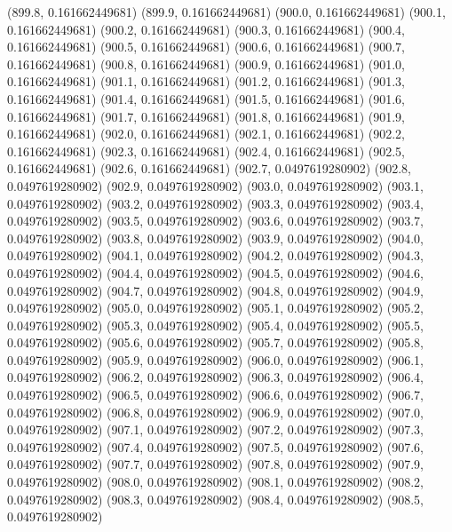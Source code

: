 {					(899.8, 0.161662449681)
					(899.9, 0.161662449681)
					(900.0, 0.161662449681)
					(900.1, 0.161662449681)
					(900.2, 0.161662449681)
					(900.3, 0.161662449681)
					(900.4, 0.161662449681)
					(900.5, 0.161662449681)
					(900.6, 0.161662449681)
					(900.7, 0.161662449681)
					(900.8, 0.161662449681)
					(900.9, 0.161662449681)
					(901.0, 0.161662449681)
					(901.1, 0.161662449681)
					(901.2, 0.161662449681)
					(901.3, 0.161662449681)
					(901.4, 0.161662449681)
					(901.5, 0.161662449681)
					(901.6, 0.161662449681)
					(901.7, 0.161662449681)
					(901.8, 0.161662449681)
					(901.9, 0.161662449681)
					(902.0, 0.161662449681)
					(902.1, 0.161662449681)
					(902.2, 0.161662449681)
					(902.3, 0.161662449681)
					(902.4, 0.161662449681)
					(902.5, 0.161662449681)
					(902.6, 0.161662449681)
					(902.7, 0.0497619280902)
					(902.8, 0.0497619280902)
					(902.9, 0.0497619280902)
					(903.0, 0.0497619280902)
					(903.1, 0.0497619280902)
					(903.2, 0.0497619280902)
					(903.3, 0.0497619280902)
					(903.4, 0.0497619280902)
					(903.5, 0.0497619280902)
					(903.6, 0.0497619280902)
					(903.7, 0.0497619280902)
					(903.8, 0.0497619280902)
					(903.9, 0.0497619280902)
					(904.0, 0.0497619280902)
					(904.1, 0.0497619280902)
					(904.2, 0.0497619280902)
					(904.3, 0.0497619280902)
					(904.4, 0.0497619280902)
					(904.5, 0.0497619280902)
					(904.6, 0.0497619280902)
					(904.7, 0.0497619280902)
					(904.8, 0.0497619280902)
					(904.9, 0.0497619280902)
					(905.0, 0.0497619280902)
					(905.1, 0.0497619280902)
					(905.2, 0.0497619280902)
					(905.3, 0.0497619280902)
					(905.4, 0.0497619280902)
					(905.5, 0.0497619280902)
					(905.6, 0.0497619280902)
					(905.7, 0.0497619280902)
					(905.8, 0.0497619280902)
					(905.9, 0.0497619280902)
					(906.0, 0.0497619280902)
					(906.1, 0.0497619280902)
					(906.2, 0.0497619280902)
					(906.3, 0.0497619280902)
					(906.4, 0.0497619280902)
					(906.5, 0.0497619280902)
					(906.6, 0.0497619280902)
					(906.7, 0.0497619280902)
					(906.8, 0.0497619280902)
					(906.9, 0.0497619280902)
					(907.0, 0.0497619280902)
					(907.1, 0.0497619280902)
					(907.2, 0.0497619280902)
					(907.3, 0.0497619280902)
					(907.4, 0.0497619280902)
					(907.5, 0.0497619280902)
					(907.6, 0.0497619280902)
					(907.7, 0.0497619280902)
					(907.8, 0.0497619280902)
					(907.9, 0.0497619280902)
					(908.0, 0.0497619280902)
					(908.1, 0.0497619280902)
					(908.2, 0.0497619280902)
					(908.3, 0.0497619280902)
					(908.4, 0.0497619280902)
					(908.5, 0.0497619280902)
}

